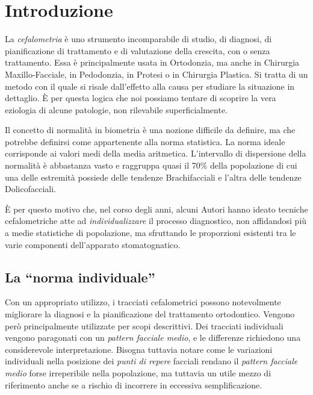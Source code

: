\chapter{Introduzione}
La \textit{cefalometria} è uno strumento incomparabile di studio, di diagnosi, di pianificazione di trattamento e di valutazione della crescita, con o senza trattamento. Essa è principalmente usata in Ortodonzia, ma anche in Chirurgia Maxillo-Facciale, in Pedodonzia, in Protesi o in Chirurgia Plastica. Si tratta di un metodo con il quale si risale dall'effetto alla causa per studiare la situazione in dettaglio. È per questa logica che noi possiamo tentare di scoprire la vera eziologia di alcune patologie, non rilevabile superficialmente.

Il concetto di normalità in biometria è una nozione difficile da definire, ma che potrebbe definirsi come appartenente alla norma statistica. La norma ideale corrisponde ai valori medi della media aritmetica. L'intervallo di dispersione della normalità è abbastanza vasto e raggruppa quasi il 70\% della popolazione di cui una delle estremità possiede delle tendenze Brachifacciali e l'altra delle tendenze Dolicofacciali.

È per questo motivo che, nel corso degli anni, alcuni Autori hanno ideato tecniche cefalometriche atte ad \textit{individualizzare} il processo diagnostico, non affidandosi più a medie statistiche di popolazione, ma sfruttando le proporzioni esistenti tra le varie componenti dell'apparato stomatognatico.

\section{La ``norma individuale''}

Con un appropriato utilizzo, i tracciati cefalometrici possono notevolmente migliorare la diagnosi e la pianificazione del trattamento ortodontico. Vengono però principalmente utilizzate per scopi descrittivi. Dei tracciati individuali vengono paragonati con un \textit{pattern facciale medio}, e le differenze richiedono una considerevole interpretazione. Bisogna tuttavia notare come le variazioni individuali nella posizione dei \textit{punti di repere} facciali rendano il \textit{pattern facciale medio} forse irreperibile nella popolazione, ma tuttavia un utile mezzo di riferimento anche se a rischio di incorrere in eccessiva semplificazione.

